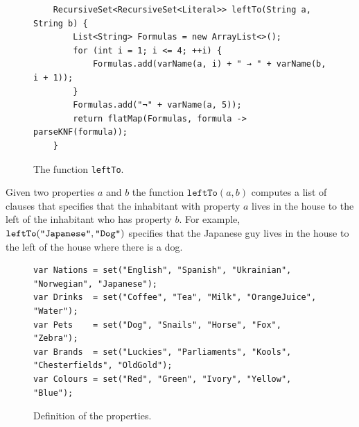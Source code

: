 \begin{figure}[!ht]
\centering
\begin{verbatim}
    RecursiveSet<RecursiveSet<Literal>> leftTo(String a, String b) {
        List<String> Formulas = new ArrayList<>();
        for (int i = 1; i <= 4; ++i) {
            Formulas.add(varName(a, i) + " → " + varName(b, i + 1));
        }
        Formulas.add("¬" + varName(a, 5));
        return flatMap(Formulas, formula -> parseKNF(formula));
    }
\end{verbatim}
\vspace*{-0.3cm}
\caption{The function \texttt{leftTo}.} %
\label{fig:leftTo}
\end{figure}

Given two properties $a$ and $b$ the function $\texttt{leftTo}(a, b)$ computes a
list of clauses that specifies that the inhabitant with property $a$ lives in
the house to the left of the inhabitant who has property $b$.  For example,
$\texttt{leftTo}(\texttt{\symbol{34}Japanese\symbol{34}}, \texttt{\symbol{34}Dog\symbol{34}})$ specifies that the
Japanese guy lives in the house to the left of the house where there is a dog.

\begin{figure}[!ht]
\centering
\begin{verbatim}
var Nations = set("English", "Spanish", "Ukrainian", "Norwegian", "Japanese");
var Drinks  = set("Coffee", "Tea", "Milk", "OrangeJuice", "Water");
var Pets    = set("Dog", "Snails", "Horse", "Fox", "Zebra");
var Brands  = set("Luckies", "Parliaments", "Kools", "Chesterfields", "OldGold");
var Colours = set("Red", "Green", "Ivory", "Yellow", "Blue");
\end{verbatim}
\vspace*{-0.3cm}
\caption{Definition of the properties.}
\label{fig:properties}
\end{figure}

